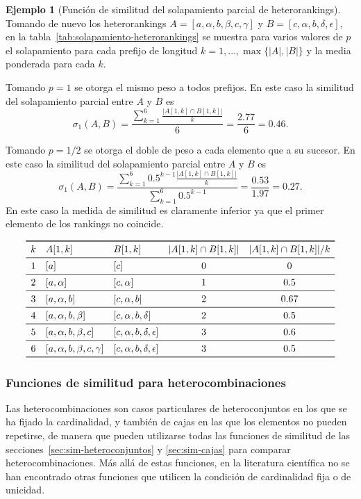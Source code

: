 \documentclass[a4paper,10pt,twoside]{article}
\theoremstyle{definition}
\newtheorem{example}{Ejemplo}
\begin{document}
\begin{example}[Función de similitud del solapamiento parcial de heterorankings]
Tomando de nuevo los heterorankings $A=[a,\alpha,b,\beta,c,\gamma]$ y $B=[c,\alpha,b,\delta,\epsilon]$, en la tabla~\ref{tab:solapamiento-heterorankings} se muestra para varios valores de $p$ el solapamiento para cada prefijo de longitud $k=1,\ldots,\max\{|A|,|B|\}$ y la media ponderada para cada $k$.

Tomando $p=1$ se otorga el mismo peso a todos prefijos.
En este caso la similitud del solapamiento parcial entre $A$ y $B$ es
\[
\sigma_1(A,B) = \frac{\sum_{k=1}^{6}\frac{|A[1,k]\cap B[1,k]|}{k}}{6} = \frac{2.77}{6}=0.46. 
\]

Tomando $p=1/2$ se otorga el doble de peso a cada elemento que a su sucesor.
En este caso la similitud del solapamiento parcial entre $A$ y $B$ es
\[
\sigma_1(A,B) = \frac{\sum_{k=1}^{6} 0.5^{k-1} \frac{|A[1,k]\cap B[1,k]|}{k}}{\sum_{k=1}^{6} 0.5^{k-1}} = \frac{0.53}{1.97}=0.27. 
\]
En este caso la medida de similitud es claramente inferior ya que el primer elemento de los rankings no coincide. 
\end{example}

\begin{table}[htbp]
\caption{Solapamiento de los heterorankings $A=[a,\alpha,b,\beta,c,\gamma]$ y $B=[c,\alpha,b,\delta,\epsilon]$.\label{tab:solapamiento-heterorankings}}
\[
\begin{array}{cllcc}
\toprule
k & A[1,k] & B[1,k] & |A[1,k]\cap B[1,k]| & |A[1,k]\cap B[1,k]|/k\\
\midrule
1 & [a] & [c] & 0 & 0\\
\midrule
2 & [a,\alpha] & [c,\alpha] & 1 & 0.5\\
\midrule
3 & [a,\alpha,b] & [c,\alpha,b] & 2 & 0.67\\
\midrule
4 & [a,\alpha,b,\beta] & [c,\alpha,b,\delta] & 2 & 0.5\\
\midrule
5 & [a,\alpha,b,\beta,c] & [c,\alpha,b,\delta,\epsilon] & 3 & 0.6\\
\midrule
6 &  [a,\alpha,b,\beta,c,\gamma] & [c,\alpha,b,\delta,\epsilon] & 3 & 0.5\\
\bottomrule
\end{array}
\]
\end{table}

\subsubsection{Funciones de similitud para heterocombinaciones}
\label{sec:sim-heterocombinaciones}
Las heterocombinaciones son casos particulares de heteroconjuntos en los que se ha fijado la cardinalidad, y también de cajas en las que los elementos no pueden repetirse, de manera que pueden utilizarse todas las funciones de similitud de las secciones~\ref{sec:sim-heteroconjuntos} y \ref{sec:sim-cajas} para comparar heterocombinaciones.
Más allá de estas funciones, en la literatura científica no se han encontrado otras funciones que utilicen la condición de cardinalidad fija o de unicidad.
\end{document}
